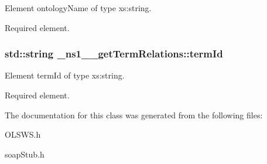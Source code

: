 Element ontologyName of type xs:string. 

Required element. \hypertarget{class__ns1____getTermRelations_a0313cc65bb3c46f344b14f0a0604b6c2}{
\subsubsection[{termId}]{\setlength{\rightskip}{0pt plus 5cm}std::string {\bf \_\-ns1\_\-\_\-getTermRelations::termId}}}
\label{class__ns1____getTermRelations_a0313cc65bb3c46f344b14f0a0604b6c2}


Element termId of type xs:string. 

Required element. 

The documentation for this class was generated from the following files:\begin{DoxyCompactItemize}
\item 
OLSWS.h\item 
soapStub.h\end{DoxyCompactItemize}
